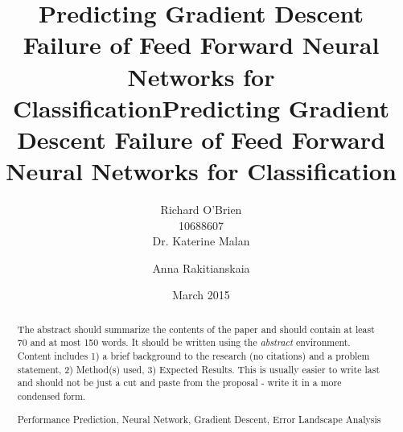 \documentclass[runningheads,a4paper]{llncs}
\newcommand{\keywords}[1]{\par\addvspace\baselineskip
\noindent\keywordname\enspace\ignorespaces#1}
\begin{document}
\mainmatter  %

\title{Predicting Gradient Descent Failure of Feed Forward Neural Networks for Classification}



%
%
\author{Richard O'Brien \\ 10688607 \\
Dr. Katerine Malan\and Anna Rakitianskaia}



%
%

\date{March 2015}
\newpage

\title{Predicting Gradient Descent Failure of Feed Forward Neural Networks for Classification}
\author{}
\institute{}


\maketitle

\begin{abstract}
The abstract should summarize the contents of the paper and should
contain at least 70 and at most 150 words. It should be written using the
\emph{abstract} environment. Content includes 1) a brief background to the research (no citations) and
a problem statement, 2) Method(s) used, 3) Expected Results. This is usually easier to write last and
should not be just a cut and paste from the proposal - write it in a more condensed form.

\keywords{Performance Prediction, Neural Network, Gradient Descent, Error Landscape Analysis}
\end{abstract}
\end{document}
